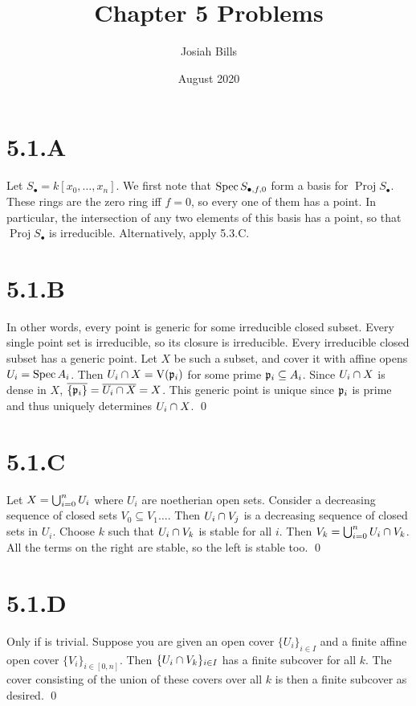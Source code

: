 \documentclass{article}
\title{Chapter 5 Problems}
\author{Josiah Bills}
\date{August 2020}
\begin{document}
\maketitle

\section{5.1.A}
Let $S_{\bullet}=k[x_0, \dots, x_n]$.
We first note that $\operatorname{Spec} S_{\bullet, f, 0}$ form a basis for $\operatorname{Proj} S_{\bullet}$. These rings are the zero ring iff $f=0$, so every one of them has a point. In particular, the intersection of any two elements of this basis has a point, so that $\operatorname{Proj} S_{\bullet}$ is irreducible. Alternatively, apply 5.3.C.

\section{5.1.B}
In other words, every point is generic for some irreducible closed subset.
Every single point set is irreducible, so its closure is irreducible.
Every irreducible closed subset has a generic point. Let $X$ be such a subset, and cover it with affine opens $U_i=\operatorname{Spec} A_i$. Then $U_i \cap X=\operatorname{V}(\mathfrak{p}_i)$ for some prime $\mathfrak{p}_i \subseteq A_i$. Since $U_i \cap X$ is dense in $X$, $\overline{\{\mathfrak{p}_i\}}=\overline{U_i \cap X}=X$. This generic point is unique since $\mathfrak{p}_i$ is prime and thus uniquely determines $U_i \cap X$. \qed

\section{5.1.C}
Let $X=\bigcup_{i=0}^n U_i$ where $U_i$ are noetherian open sets. Consider a decreasing sequence of closed sets $V_0 \subseteq V_1 \dots$. Then $U_i \cap V_j$ is a decreasing sequence of closed sets in $U_i$. Choose $k$ such that $U_i \cap V_k$ is stable for all $i$. Then $V_k=\bigcup_{i=0}^n U_i \cap V_k$. All the terms on the right are stable, so the left is stable too. \qed

\section{5.1.D}
Only if is trivial. Suppose you are given an open cover $\{U_i\}_{i \in I}$ and a finite affine open cover $\{V_i\}_{i \in [0, n]}$. Then $\{U_i\cap V_k\}_{i \in I}$ has a finite subcover for all $k$. The cover consisting of the union of these covers over all $k$ is then a finite subcover as desired. \qed
\end{document}

